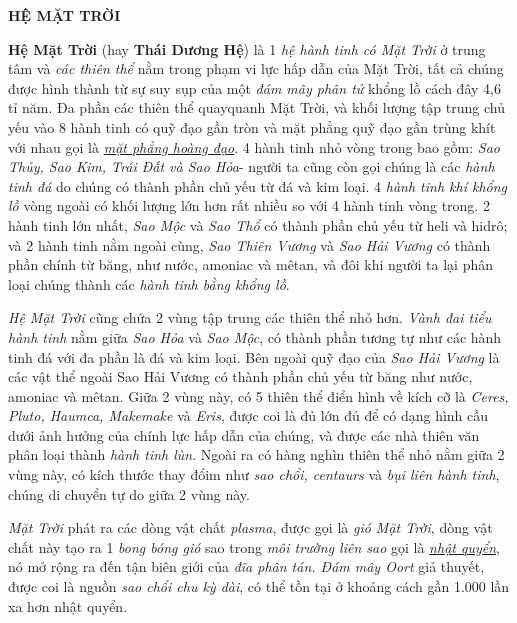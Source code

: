 \documentclass[12pt, a4paper]{article}
\begin{document}
\textbf {\LARGE HỆ MẶT TRỜI} 
 
 \textbf{Hệ Mặt Trời} (hay \textbf{Thái Dương Hệ}) là  1 \textit{hệ hành tinh có Mặt Trời} ở trung tâm và \textit{các thiên thể} nằm trong phạm vi lực hấp dẫn của Mặt Trời, tất cả chúng được hình thành từ sự suy sụp của một\textit{ đám mây phân tử } khổng lồ cách đây 4,6 tỉ năm. Đa phần các thiên thể quayquanh Mặt Trời, và khối lượng tập trung chủ yếu vào 8 hành tinh có quỹ đạo gần tròn và mặt phẳng quỹ đạo gần trùng khít với nhau gọi là \textit{\underline{ mặt phẳng hoàng đạo}}. 4 hành tinh nhỏ vòng trong bao gồm: \textit{Sao Thủy, Sao Kim, Trái Đất và Sao Hỏa}- người ta cũng còn gọi chúng là các \textit{hành tinh đá} do chúng có thành phần chủ yếu từ đá và kim loại. 4 \textit{hành tinh khí khổng lồ} vòng ngoài có khối lượng lớn hơn rất nhiều so với 4 hành tinh vòng trong. 2 hành tinh lớn nhất, \textit{Sao Mộc} và \textit{Sao Thổ} có thành phần chủ yếu từ heli và hidrô; và 2 hành tinh nằm ngoài cùng, \textit{Sao Thiên Vương} và \textit{Sao Hải Vương} có thành phần chính từ băng, như nước, amoniac và mêtan, và đôi khi người ta lại phân loại chúng thành các \textit{hành tinh bằng khổng lồ}.

\textit{Hệ Mặt Trời} cũng chứa 2 vùng tập trung các thiên thể nhỏ hơn. \textit{Vành đai tiểu hành tinh} nằm giữa \textit{Sao Hỏa} và \textit{Sao Mộc}, có thành phần tương tự như các hành tinh đá với đa phần là đá và kim loại. Bên ngoài quỹ đạo của \textit{Sao Hải Vương} là các vật thể ngoài Sao Hải Vương có thành phần chủ yếu từ băng như nước, amoniac và mêtan. Giữa 2 vùng này, có 5 thiên thể điển hình về kích cỡ là \textit{Ceres, Pluto, Haumca, Makemake} và \textit{Eris}, được coi là đủ lớn đủ để có dạng hình cầu dưới ảnh hưởng của chính lực hấp dẫn của chúng, và được các nhà thiên văn phân loại thành \textit{hành tinh lùn}. Ngoài ra có hàng nghìn thiên thể nhỏ nằm giữa 2 vùng này, có kích thước thay đổim như \textit{sao chổi, centaurs} và \textit{bụi liên hành tinh}, chúng di chuyển tự do giữa 2 vùng này.

\textit{Mặt Trời} phát ra các dòng vật chất \textit{plasma}, được gọi là \textit{gió Mặt Trời}, dòng vật chất này tạo ra 1 \textit{bong bóng gió} sao trong \textit{môi trường liên sao} gọi là \textit{\underline{nhật quyển}}, nó mở rộng ra đến tận biên giới của \textit{đĩa phân tán. Đám mây Oort} giả thuyết, được coi là nguồn \textit{sao chổi chu kỳ dài}, có thể tồn tại ở khoảng cách gần 1.000 lần xa hơn nhật quyển.
\end{document}
